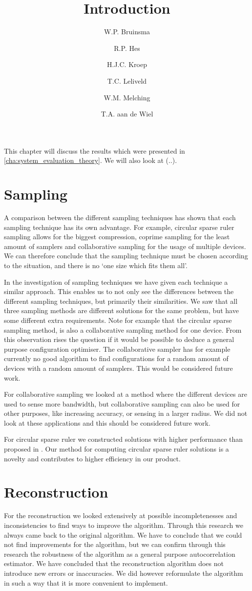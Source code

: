 \documentclass[a4paper, openany, oneside]{memoir}
\title{Introduction}
\author{W.P. Bruinsma \and R.P. Hes \and H.J.C. Kroep \and T.C. Leliveld \and W.M. Melching \and T.A. aan de Wiel}
\begin{document}
This chapter will discuss the results which were presented in \cref{cha:system_evaluation_theory}. We will also look at (..).

\section{Sampling}
A comparison between the different sampling techniques has shown that each sampling technique has its own advantage. For example, circular sparse ruler sampling allows for the biggest compression, coprime sampling for the least amount of samplers and collaborative sampling for the usage of multiple devices. We can therefore conclude that the sampling technique must be chosen according to the situation, and there is no `one size which fits them all'.

In the investigation of sampling techniques we have given each technique a similar approach. This enables us to not only see the differences between the different sampling techniques, but primarily their similarities. We saw that all three sampling methods are different solutions for the same problem, but have some different extra requirements. Note for example that the circular sparse sampling method, is also a collaborative sampling method for one device. From this observation rises the question if it would be possible to deduce a  general purpose configuration optimiser. The collaborative sampler has for example currently no good algorithm to find configurations for a random amount of devices with a random amount of samplers. This would be considered future work.  

For collaborative sampling we looked at a method where the different devices are used to sense more bandwidth, but collaborative sampling can also be used for other purposes, like increasing accuracy, or sensing in a larger radius. We did not look at these applications and this should be considered future work.

For circular sparse ruler we constructed solutions with higher performance than proposed in \cite{ariananda2012compressive}. Our method for computing circular sparse ruler solutions is a novelty and contributes to higher efficiency in our product.

\section{Reconstruction}
For the reconstruction we looked extensively at possible incompletenesses and inconsistencies to find ways to improve the algorithm. Through this research we always came back to the original algorithm. We have to conclude that we could not find improvements for the algorithm, but we can confirm through this research the robustness of the algorithm as a general purpose autocorrelation estimator. We have concluded that the reconstruction algorithm does not introduce new errors or inaccuracies. We did however reformulate the algorithm in such a way that it is more convenient to implement.
\end{document}
